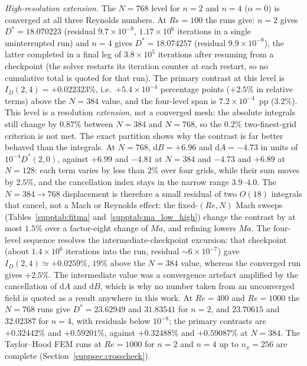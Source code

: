 \emph{High-resolution extension.} The $N=768$ level for $n=2$ and $n=4$ ($\alpha=0$) is converged at all three Reynolds numbers. At $Re=100$ the runs give: $n=2$ gives $D^*=18.070223$ (residual $9.7\times10^{-9}$, $1.17\times10^{6}$ iterations in a single uninterrupted run) and $n=4$ gives $D^*=18.074257$ (residual $9.9\times10^{-9}$), the latter completed in a final leg of $3.8\times10^{5}$ iterations after resuming from a checkpoint (the solver restarts its iteration counter at each restart, so no cumulative total is quoted for that run). The primary contrast at this level is $I_D(2,4)=+0.022323\%$, i.e.\ $+5.4\times10^{-4}$ percentage points ($+2.5\%$ in relative terms) above the $N=384$ value, and the four-level span is $7.2\times10^{-4}$~pp ($3.2\%$). This level is a resolution \emph{extension}, not a converged mesh: the absolute integrals still change by $0.87\%$ between $N=384$ and $N=768$, so the $0.2\%$ two-finest-grid criterion is not met. The exact partition shows why the contrast is far better behaved than the integrals. At $N=768$, $\mathrm{d}B=+6.96$ and $\mathrm{d}A=-4.73$ in units of $10^{-4}D^*(2,0)$, against $+6.99$ and $-4.81$ at $N=384$ and $-4.73$ and $+6.89$ at $N=128$: each term varies by less than $2\%$ over four grids, while their sum moves by $2.5\%$, and the cancellation index stays in the narrow range $3.9$--$4.0$. The $N=384\to768$ displacement is therefore a small residual of two $O(18)$ integrals that cancel, not a Mach or Reynolds effect: the fixed-$(Re,N)$ Mach sweeps (Tables~\ref{supptab:fitma} and~\ref{supptab:ma_low_high}) change the contrast by at most $1.5\%$ over a factor-eight change of $Ma$, and refining lowers $Ma$. The four-level sequence resolves the intermediate-checkpoint excursion: that checkpoint (about $1.4\times10^{6}$ iterations into the run, residual $\sim6\times10^{-7}$) gave $I_D(2,4)\simeq+0.0259\%$, $19\%$ above the $N=384$ value, whereas the converged run gives $+2.5\%$. The intermediate value was a convergence artefact amplified by the cancellation of $\mathrm{d}A$ and $\mathrm{d}B$, which is why no number taken from an unconverged field is quoted as a result anywhere in this work. At $Re=400$ and $Re=1000$ the $N=768$ runs give $D^*=23.62949$ and $31.83541$ for $n=2$, and $23.70615$ and $32.02387$ for $n=4$, with residuals below $10^{-8}$; the primary contrasts are $+0.32442\%$ and $+0.59201\%$, against $+0.32488\%$ and $+0.59087\%$ at $N=384$. The Taylor--Hood FEM runs at $Re=1000$ for $n=2$ and $n=4$ up to $n_x=256$ are complete (Section~\ref{suppsec:crosscheck}).
